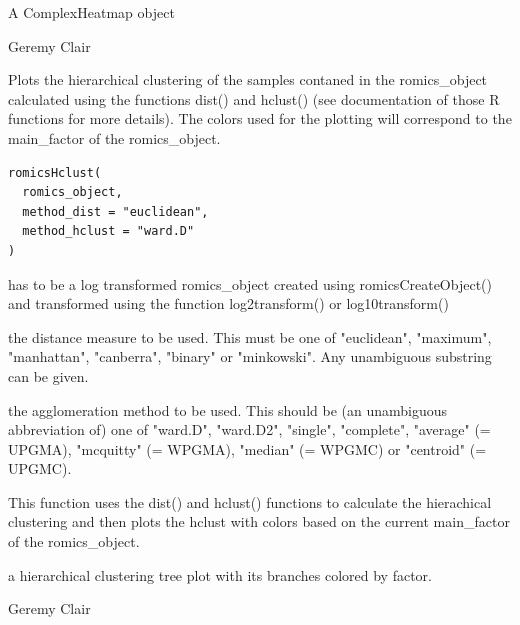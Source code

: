 \documentclass[a4paper]{book}
\begin{document}
%
\begin{Value}
A ComplexHeatmap object
\end{Value}
%
\begin{Author}
Geremy Clair
\end{Author}
%
\begin{Description}
Plots the hierarchical clustering of the samples contaned in the romics\_object calculated using the functions dist() and hclust() (see documentation of those R functions for more details). The colors used for the plotting will correspond to the main\_factor of the romics\_object.
\end{Description}
%
\begin{Usage}
\begin{verbatim}
romicsHclust(
  romics_object,
  method_dist = "euclidean",
  method_hclust = "ward.D"
)
\end{verbatim}
\end{Usage}
%
\begin{Arguments}
\begin{ldescription}
\item[\code{romics\_object}] has to be a log transformed romics\_object created using romicsCreateObject() and transformed using the function log2transform() or log10transform()

\item[\code{method\_dist}] the distance measure to be used. This must be one of "euclidean", "maximum", "manhattan", "canberra", "binary" or "minkowski". Any unambiguous substring can be given.

\item[\code{method\_hclust}] the agglomeration method to be used. This should be (an unambiguous abbreviation of) one of "ward.D", "ward.D2", "single", "complete", "average" (= UPGMA), "mcquitty" (= WPGMA), "median" (= WPGMC) or "centroid" (= UPGMC).
\end{ldescription}
\end{Arguments}
%
\begin{Details}
This function uses the dist() and hclust() functions to calculate the hierachical clustering and then plots the hclust with colors based on the current main\_factor of the romics\_object.
\end{Details}
%
\begin{Value}
a hierarchical clustering tree plot with its branches colored by factor.
\end{Value}
%
\begin{Author}
Geremy Clair
\end{Author}
\end{document}
